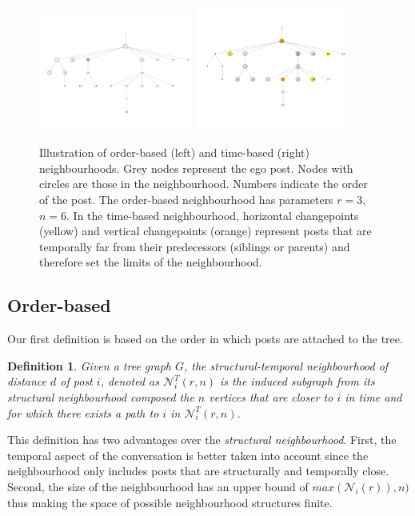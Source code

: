\documentclass[conference]{IEEEtran}
\newtheorem{definition}{Definition}
\begin{document}
\begin{figure}
\centering
\includegraphics[width=0.45\textwidth]{order_neighbourhood}
\includegraphics[width=0.45\textwidth]{breakpoints}
\caption{Illustration of order-based (left) and time-based (right) neighbourhoods. Grey nodes represent the ego post. Nodes with circles are those in the neighbourhood. Numbers indicate the order of the post. The order-based neighbourhood has parameters $r=3$, $n=6$. In the time-based neighbourhood, horizontal changepoints (yellow) and vertical changepoints (orange) represent posts that are temporally far from their predecessors (siblings or parents) and therefore set the limits of the neighbourhood.}
\label{fig:cutpoints}
\end{figure}
\subsection{Order-based}
Our first definition is based on the order in which posts are attached to the tree. 
\begin{definition}
Given a tree graph $G$, the \textit{structural-temporal neighbourhood} of distance $d$ of post $i$, denoted as $\mathcal{N}_{i}^T(r,n)$ is the induced subgraph from its structural neighbourhood composed the $n$ vertices that are closer to $i$ in time and for which there exists a path to $i$ in $\mathcal{N}_{i}^T(r,n)$.  
\end{definition}

This definition has two advantages over the \textit{structural neighbourhood}. First, the temporal aspect of the conversation is better taken into account since the neighbourhood only includes posts that are structurally and temporally close. Second, the size of the neighbourhood has an upper bound of $max(\mathcal{N}_i(r)), n)$ thus making the space of possible neighbourhood structures finite.
\end{document}
